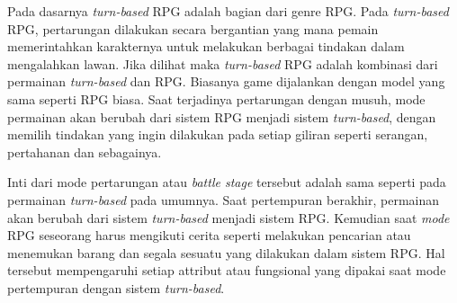 Pada dasarnya \textit{turn-based} RPG \citep{Panumate2015} adalah bagian dari genre RPG. Pada \textit{turn-based} RPG, pertarungan dilakukan secara bergantian yang mana pemain memerintahkan karakternya untuk melakukan berbagai tindakan dalam mengalahkan lawan. Jika dilihat maka \textit{turn-based} RPG adalah kombinasi dari permainan \textit{turn-based} dan RPG. Biasanya game dijalankan dengan model yang sama seperti RPG biasa. Saat terjadinya pertarungan dengan musuh, mode permainan akan berubah dari sistem RPG menjadi sistem \textit{turn-based}, dengan memilih tindakan yang ingin dilakukan pada setiap giliran seperti serangan, pertahanan dan sebagainya.
\vspace{1ex}

Inti dari mode pertarungan atau \textit{battle stage} tersebut adalah sama seperti pada permainan \textit{turn-based} pada umumnya. Saat pertempuran berakhir, permainan akan berubah dari sistem \textit{turn-based} menjadi sistem RPG. Kemudian saat \textit{mode} RPG seseorang harus mengikuti cerita seperti melakukan pencarian atau menemukan barang dan segala sesuatu yang dilakukan dalam sistem RPG. Hal tersebut mempengaruhi setiap attribut atau fungsional yang dipakai saat mode pertempuran dengan sistem \textit{turn-based}.
